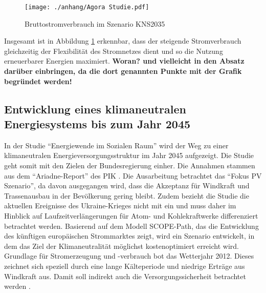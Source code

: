 		\begin{figure} [H]
			\centering
			\label{Abb. Zunahme Flexibilität} 
			\texttt{[image: ./anhang/Agora Studie.pdf]}
			\caption{Bruttostromverbrauch im Szenario KNS2035 \cite[S.33]{Agora_KlimaneutralesStromsystem}}
		\end{figure}
			
		Insgesamt ist in Abbildung \ref{Abb. Zunahme Flexibilität} erkennbar, dass der steigende Stromverbrauch gleichzeitig der Flexibilität des Stromnetzes dient und so die Nutzung erneuerbarer Energien maximiert. \textbf{Woran? und vielleicht in den Absatz darüber einbringen, da die dort genannten Punkte mit der Grafik begründet werden!} \\
	
	\subsection{Entwicklung eines klimaneutralen Energiesystems bis zum Jahr 2045}
	
		In der Studie "`Energiewende im Sozialen Raum"' wird der Weg zu einer klimaneutralen Energieversorgungsstruktur im Jahr 2045 aufgezeigt.
		Die Studie geht somit mit den Zielen der Bundesregierung einher.
		Die Annahmen stammen aus dem "`Ariadne-Report"' des PIK \cite[S.150]{AriadneReport}.
		Die Ausarbeitung betrachtet das "`Fokus PV Szenario"', da davon ausgegangen wird, dass die Akzeptanz für Windkraft und Trassenausbau in der Bevölkerung gering bleibt.
		Zudem bezieht die Studie die aktuellen Ereignisse des Ukraine-Krieges nicht mit ein und muss daher im Hinblick auf Laufzeitverlängerungen für Atom- und Kohlekraftwerke differenziert betrachtet werden.
		Basierend auf dem Modell SCOPE-Path, das die Entwicklung des künftigen europäischen Strommarktes zeigt, wird ein Szenario entwickelt, in dem das Ziel der Klimaneutralität möglichst kostenoptimiert erreicht wird.
		Grundlage für Stromerzeugung und -verbrauch bot das Wetterjahr 2012. Dieses zeichnet sich speziell durch eine lange Kälteperiode und niedrige Erträge aus Windkraft aus. Damit soll indirekt auch die Versorgungssicherheit betrachtet werden \cite[S.2]{ESRa_Fraunhofer}. \\
		
